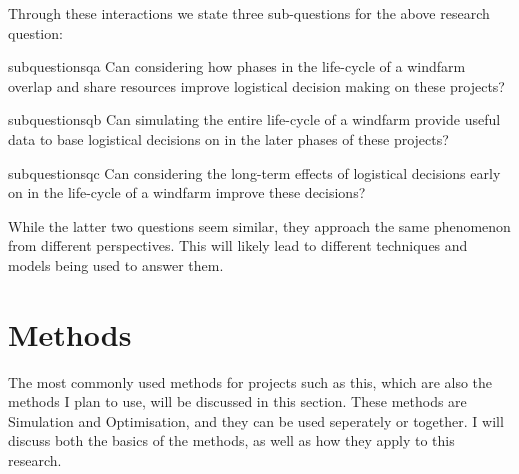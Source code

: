 \documentclass[a4paper,12pt]{article}
\begin{document}
Through these interactions we state three sub-questions for the above research question:

\begin{restatable}{subquestion}{sqa}
\label{sqa}
Can considering how phases in the life-cycle of a windfarm overlap and share resources improve logistical decision making on these projects?
\end{restatable}

\begin{restatable}{subquestion}{sqb}
\label{sqb}
Can simulating the entire life-cycle of a windfarm provide useful data to base logistical decisions on in the later phases of these projects?
\end{restatable}

\begin{restatable}{subquestion}{sqc}
\label{sqd}
Can considering the long-term effects of logistical decisions early on in the life-cycle of a windfarm improve these decisions? 
\end{restatable}

While the latter two questions seem similar, they approach the same phenomenon from different perspectives. This will likely lead to different techniques and models being used to answer them. 

\pagebreak

\section{Methods} \label{s:meth}
The most commonly used methods for projects such as this, which are also the methods I plan to use, will be discussed in this section. These methods are Simulation and Optimisation, and they can be used seperately or together. I will discuss both the basics of the methods, as well as how they apply to this research. 
\end{document}
